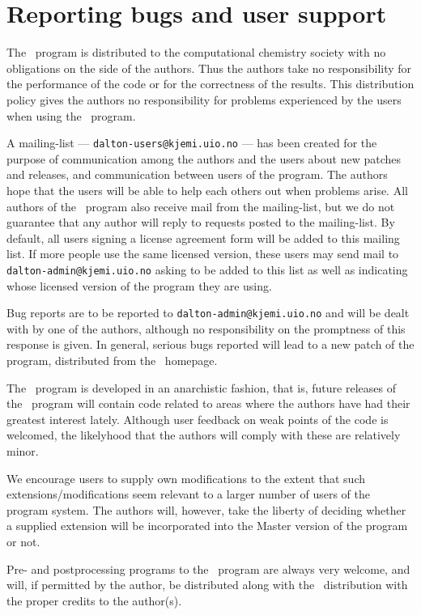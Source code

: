 \section{Reporting bugs and user support}

The \siraba\ program is distributed to the computational chemistry
society with no obligations on the side of the
authors. Thus the authors take no responsibility
for the performance
of the code or for the correctness of the
results. This distribution
policy gives the authors no responsibility for problems experienced by
the users when using the \siraba\ program.

A mailing-list ---
\verb|dalton-users@kjemi.uio.no| --- has been created for
the purpose of communication among the authors and the users about
new patches and releases, and communication between users of the
program. The authors hope that the
users will be able to help each others out when problems
arise. All authors of the \siraba\ program also receive mail from the
mailing-list, but we do not guarantee that any author will reply to
requests posted to the mailing-list. By default, all users signing a
license agreement form will be added to this mailing list. If more
people use the same licensed version, these users may send mail to
\verb|dalton-admin@kjemi.uio.no| asking to be added to this list as
well as indicating whose licensed version of the program they are using.

Bug reports are to be reported to \verb|dalton-admin@kjemi.uio.no| and
will be dealt with by one of the authors, although no responsibility
on the promptness of this response is given. In general, serious bugs
reported will lead to a new patch of the program, distributed from the
\siraba\ homepage.

The \siraba\ program is developed in an anarchistic fashion, that is,
future releases of the \siraba\ program will contain code related to
areas where the authors have had their greatest interest
lately. Although user feedback on weak points of the code is welcomed, the
likelyhood that the authors will comply with these are relatively
minor.

We encourage users to supply own modifications to
the extent that
such extensions/modifications seem relevant to a larger number of
users of the program system. The authors will, however, take the
liberty of deciding whether a supplied extension will be incorporated
into the Master version of the program or not.

Pre- and postprocessing programs to the \siraba\ program are always
very welcome, and will, if permitted by the author, be distributed along
with the \siraba\ distribution with the proper credits to the
author(s).
